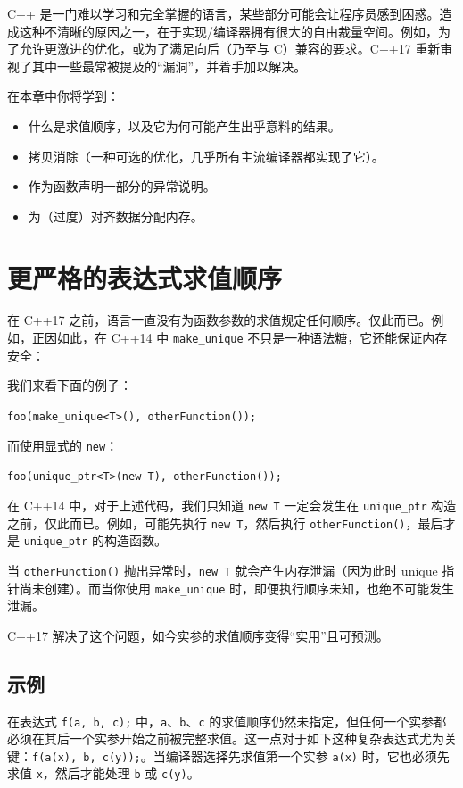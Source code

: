 C++ 是一门难以学习和完全掌握的语言，某些部分可能会让程序员感到困惑。造成这种不清晰的原因之一，在于实现/编译器拥有很大的自由裁量空间。例如，为了允许更激进的优化，或为了满足向后（乃至与 C）兼容的要求。C++17 重新审视了其中一些最常被提及的“漏洞”，并着手加以解决。

在本章中你将学到：

\begin{itemize}
\item 什么是求值顺序，以及它为何可能产生出乎意料的结果。
\item 拷贝消除（一种可选的优化，几乎所有主流编译器都实现了它）。
\item 作为函数声明一部分的异常说明。
\item 为（过度）对齐数据分配内存。
\end{itemize}

\section{更严格的表达式求值顺序}

在 C++17 之前，语言一直没有为函数参数的求值规定任何顺序。仅此而已。例如，正因如此，在 C++14 中 \texttt{make\_unique} 不只是一种语法糖，它还能保证内存安全：

我们来看下面的例子：

\texttt{foo(make\_unique<T>(), otherFunction());}

而使用显式的 \texttt{new}：

\texttt{foo(unique\_ptr<T>(new T), otherFunction());}

在 C++14 中，对于上述代码，我们只知道 \texttt{new T} 一定会发生在 \texttt{unique\_ptr} 构造之前，仅此而已。例如，可能先执行 \texttt{new T}，然后执行 \texttt{otherFunction()}，最后才是 \texttt{unique\_ptr} 的构造函数。

当 \texttt{otherFunction()} 抛出异常时，\texttt{new T} 就会产生内存泄漏（因为此时 unique 指针尚未创建）。而当你使用 \texttt{make\_unique} 时，即便执行顺序未知，也绝不可能发生泄漏。

C++17 解决了这个问题，如今实参的求值顺序变得“实用”且可预测。

\subsection{示例}

在表达式 \texttt{f(a, b, c);} 中，\texttt{a}、\texttt{b}、\texttt{c} 的求值顺序仍然未指定，但任何一个实参都必须在其后一个实参开始之前被完整求值。这一点对于如下这种复杂表达式尤为关键：\texttt{f(a(x), b, c(y));}。当编译器选择先求值第一个实参 \texttt{a(x)} 时，它也必须先求值 \texttt{x}，然后才能处理 \texttt{b} 或 \texttt{c(y)}。

